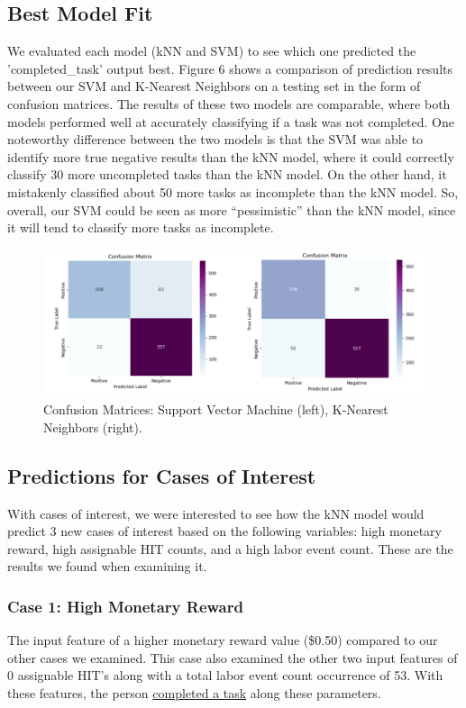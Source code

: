 \documentclass[11pt]{article}
\begin{document}
\subsection{Best Model Fit}
We evaluated each model (kNN and SVM) to see which one predicted the 'completed\_task' output best. Figure 6 shows a comparison of prediction results between our SVM and K-Nearest Neighbors on a testing set in the form of confusion matrices. The results of these two models are comparable, where both models performed well at accurately classifying if a task was not completed. One noteworthy difference between the two models is that the SVM was able to identify more true negative results than the kNN model, where it could correctly classify 30 more uncompleted tasks than the kNN model. On the other hand, it mistakenly classified about 50 more tasks as incomplete than the kNN model. So, overall, our SVM could be seen as more “pessimistic” than the kNN model, since it will tend to classify more tasks as incomplete.

\begin{figure}[hbt!]
  \centering
  \includegraphics[width=\linewidth]{figures/confusion-matrices-svm-knn}
  \caption{Confusion Matrices: Support Vector Machine (left), K-Nearest Neighbors (right).}
\end{figure}

\pagebreak

\subsection{Predictions for Cases of Interest}
With cases of interest, we were interested to see how the kNN model would predict 3 new cases of interest based on the following variables: high monetary reward, high assignable HIT counts, and a high labor event count. These are the results we found when examining it.

\subsubsection{Case 1: High Monetary Reward}
The input feature of a higher monetary reward value (\$0.50) compared to our other cases we examined. This case also examined the other two input features of 0 assignable HIT’s along with a total labor event count occurrence of 53. With these features, the person \underline{completed a task} along these parameters.
\end{document}
